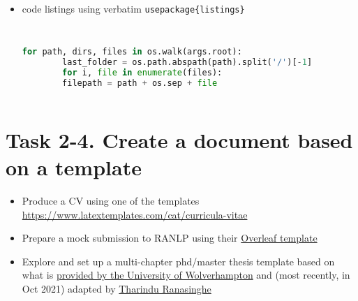 \documentclass[a4paper,11pt]{article}
\begin{document}
\begin{itemize}
\begin{itemize}
		\item code listings using verbatim \verb|usepackage{listings}|
		
		\begin{lstlisting}
		
		\end{lstlisting}
		
		
		
		\begin{lstlisting}[language=Python, caption=Looping thru all folders under 'root']
		for path, dirs, files in os.walk(args.root):
		last_folder = os.path.abspath(path).split('/')[-1]
		for i, file in enumerate(files):
		filepath = path + os.sep + file
		
		\end{lstlisting}
		
	\end{itemize}
\end{itemize}

\lstlistoflistings


\section*{Task 2-4. Create a document based on a template}
\label{task}

\begin{tcolorbox}[width=\textwidth, colback={yellow!40!white}, title={You can complete any of the following tasks. Each involves selecting a template and exploring the commands it uses by modifying it. Acknowledge the original template (add a link to it)in your source code}, colbacktitle=yellow!60!white, coltitle=black]
	\begin{itemize}
		\item Produce a CV using one of the templates \\ \href{here}{https://www.latextemplates.com/cat/curricula-vitae}
		\item Prepare a mock submission to RANLP using their \href{https://www.overleaf.com/latex/templates/instructions-for-ranlp-2021-proceedings/snyphxfdqcpz}{Overleaf template}
		\item Explore and set up a multi-chapter phd/master thesis template based on what is \href{https://github.com/snim2/phdtemplate}{provided by the University of Wolverhampton} and (most recently, in Oct 2021) adapted by \href{https://github.com/TharinduDR/Thesis/}{Tharindu Ranasinghe}
	\end{itemize}
	
\end{tcolorbox}%
\end{document}
